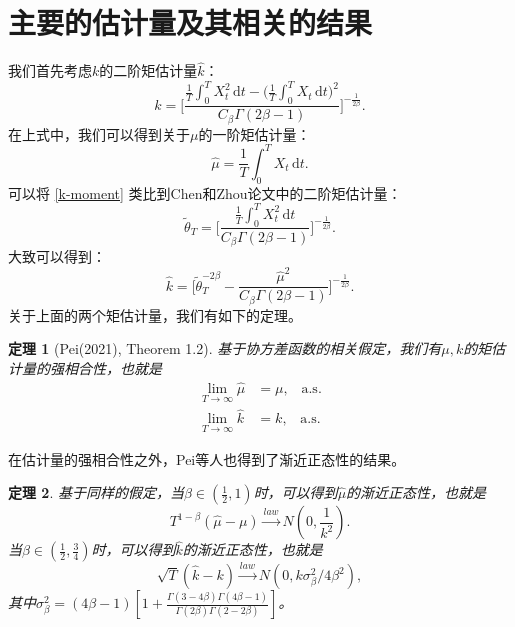 \documentclass[reqno,a4paper,12pt]{amsart}
\newcommand\distribution{\stackrel{law}{\longrightarrow}}
\newcommand\dif{\,\mathrm{d}}
\newtheorem{theorem}{定理}[section]
\begin{document}
\section{主要的估计量及其相关的结果}
我们首先考虑$k$的二阶矩估计量$\hat{k}$：
\begin{equation}
    \hat{k}=\biggl[\frac{\frac{1}{T}\int_0^T X^2_t\dif t - \bigl(\frac{1}{T}\int_0^T X_t\dif t\bigr)^2}{C_\beta \Gamma(2\beta -1)}\biggr]^{-\frac{1}{2\beta}}.
    \label{k-moment}
\end{equation}
在上式中，我们可以得到关于$\mu$的一阶矩估计量：
\begin{equation}
    \hat{\mu}=\frac{1}{T}\int_0^T X_t\dif t.
    \label{mu-moment}
\end{equation}
可以将 \eqref{k-moment} 类比到Chen和Zhou论文中的二阶矩估计量：
\begin{equation*}
    \tilde{\theta}_T=\biggl[\frac{\frac{1}{T}\int^T_0 X^2_t\dif t}{C_\beta\Gamma(2\beta -1)}\biggr]^{-\frac{1}{2\beta}}.
\end{equation*}
大致可以得到：
\begin{equation*}
    \hat{k}=\biggl[\tilde{\theta}_T^{-2\beta}-\frac{\hat{\mu}^2}{C_\beta\Gamma(2\beta -1)}\biggr]^{-\frac{1}{2\beta}}.
\end{equation*}
关于上面的两个矩估计量，我们有如下的定理。
\begin{theorem}[Pei(2021), Theorem 1.2]
    基于协方差函数的相关假定，我们有$\mu, k$的矩估计量的强相合性，也就是
    \begin{equation*}
        \begin{split}
            \lim_{T\to\infty} \hat{\mu}&=\mu,\;\;\;\mathrm{a.s.}\\
            \lim_{T\to\infty} \hat{k}&=k,\;\;\;\mathrm{a.s.}
        \end{split}
    \end{equation*}
\end{theorem}
在估计量的强相合性之外，Pei等人也得到了渐近正态性的结果。
\begin{theorem}
    基于同样的假定，当$\beta\in(\frac{1}{2},1)$时，可以得到$\hat{\mu}$的渐近正态性，也就是
    \begin{equation*}
        T^{1-\beta}(\hat{\mu}-\mu)\stackrel{law}{\longrightarrow} N(0,\frac{1}{k^2}).
    \end{equation*}
    当$\beta\in(\frac{1}{2},\frac{3}{4})$时，可以得到$\hat{k}$的渐近正态性，也就是
    \begin{equation*}
        \sqrt{T}(\hat{k}-k)\distribution N(0, k\sigma^2_\beta/4\beta^2),
    \end{equation*}
    其中$\sigma^2_\beta=(4\beta-1)[1+\frac{\Gamma(3-4\beta)\Gamma(4\beta-1)}{\Gamma(2\beta)\Gamma(2-2\beta)}]$。
\end{theorem}
\end{document}
